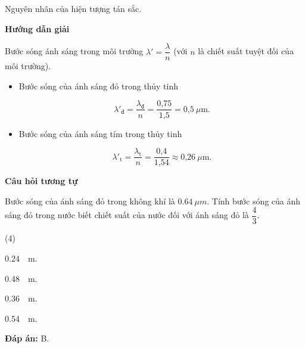 \begin{dang}{Nguyên nhân của hiện tượng tán sắc.}
	
	{	
		\begin{center}
			\textbf{Hướng dẫn giải}
		\end{center}
		
		Bước sóng ánh sáng trong môi trường $\lambda ' =\dfrac{\lambda}{n}$ (với $n$ là chiết suất tuyệt đối của môi trường).
		
		\begin{itemize}
			\item Bước sóng của ánh sáng đỏ trong thủy tinh
			
			\begin{equation*}
				\lambda'_{\text{đ}} =\dfrac{\lambda_{\text{đ}}}{n}=\dfrac{\text{0,75}}{\text{1,5}}=\text{0,5}\ \mu \text{m}.
			\end{equation*}
			\item Bước sóng của ánh sáng tím trong thủy tinh
			
			\begin{equation*}
				\lambda'_{\text{t}} =\dfrac{\lambda_{\text{t}}}{n}=\dfrac{\text{0,4}}{\text{1,54}}\approx \text{0,26}\ \mu \text{m}.
			\end{equation*}
		\end{itemize}
		
		\begin{center}
			\textbf{Câu hỏi tương tự}
		\end{center}
		
		Bước sóng của ánh sáng đỏ trong không khí là $ \SI{0.64}{\mu m} $. Tính 	bước sóng của ánh sáng đỏ trong nước biết chiết suất của nước đối với ánh sáng đỏ là $ \dfrac{4}{3} $.
		\begin{mcq}(4)
			\item \SI{0,24}{\mu m}.
			\item \SI{0,48}{\mu m}.
			\item \SI{0,36}{\mu m}.
			\item \SI{0,54}{\mu m}.
		\end{mcq}
		\textbf{Đáp án:} B.
	}
	

\end{dang}
